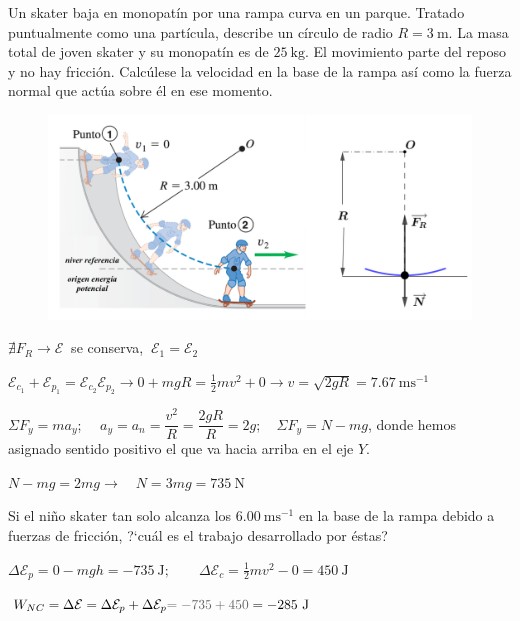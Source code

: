 \begin{prob}
Un skater baja en monopatín por una rampa curva en un parque. Tratado puntualmente como una partícula, describe un círculo de radio $R=3\ \mathrm{m}$. La masa total de joven skater y su monopatín es de $25\ \mathrm{kg}$. El movimiento parte del reposo y no hay fricción. Calcúlese la velocidad en la base de la rampa así como la fuerza normal que actúa sobre él en ese momento.	
\end{prob}
\vspace{-4mm}\begin{figure}[H]
	\centering
	\includegraphics[width=1\textwidth]{imagenes/imagenes04/T04IM14.png}
\end{figure}
 $  \nexists F_R \to \mathcal E \ $ se conserva, $\ \mathcal E_1=\mathcal E_2$
 
 $\mathcal E_{c_1}+\mathcal E_{p_1}=\mathcal E_{c_2}\mathcal E_{p_2} \to 0+mgR=\frac 1 2 m v^2 +0 \to v=\sqrt{2gR}=7.67\ \mathrm{ms}^{-1}$
 
 $\Sigma F_y=ma_y$; $\quad a_y=a_n=\dfrac {v^2}{R}=\dfrac{2gR}{R}=2g; \quad \Sigma F_y=N-mg$, donde hemos asignado sentido positivo el que va hacia arriba en el eje $Y$.
 
 $N-mg=2mg \to \quad N=3mg=735\ \mathrm{N}$
 
 \begin{prob}
 	Si el niño skater tan solo alcanza los $6.00 \ \mathrm{ms}^{-1}$ en la base de la rampa debido a fuerzas de fricción, ?`cuál es el trabajo desarrollado por éstas?
 \end{prob}
 

 \vspace{-3mm}$\Delta \mathcal E_p=0-mgh=-735\ \mathrm{J}; \qquad \Delta \mathcal E_c=\frac 1 2 m v^2-0=450\ \mathrm{J}$
 
  $ W_{NC}=\Delta \mathcal E = \Delta \mathcal E_p+\Delta \mathcal E_p\textcolor{gris}{=-735+450}=-285\ \mathrm{J}$
  
